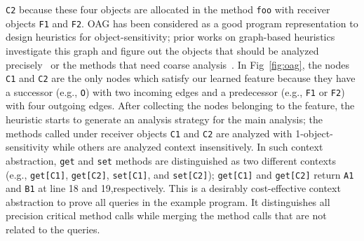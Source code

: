 {\tt C2} because these four objects are allocated in the method {\tt foo} with receiver objects {\tt F1} and {\tt F2}.
OAG has been considered as a good program representation to design heuristics for object-sensitivity;
prior works on graph-based heuristics investigate this graph and figure out the objects that should be analyzed precisely~\cite{Tan2017} or the methods that need coarse analysis~\cite{Li2018b}.
In Fig~\ref{fig:oag}, the nodes {\tt C1} and {\tt C2} are the only nodes which satisfy our learned feature 
because they have a successor (e.g., {\tt O}) with two incoming edges and a predecessor (e.g., {\tt F1} or {\tt F2}) with
four outgoing edges. 
After collecting the nodes belonging to the feature, the heuristic starts to generate an analysis strategy for the main analysis;
the methods called under receiver objects {\tt C1} and {\tt C2} are analyzed with 1-object-sensitivity while others are analyzed context insensitively.
In such context abstraction, {\tt get} and {\tt set} methods are distinguished as two different contexts (e.g., {\tt get[C1]}, {\tt get[C2]}, {\tt set[C1]}, and {\tt set[C2]});
{\tt get[C1]} and {\tt get[C2]} return {\tt A1} and {\tt B1} at line 18 and 19,respectively.
This is a desirably cost-effective context abstraction to prove all queries in the example program.
It distinguishes all precision critical method calls while merging the method calls that are not related to the queries.

